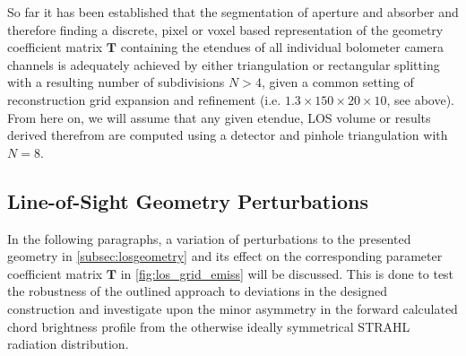             So far it has been established that the segmentation of aperture and absorber and therefore finding a discrete, pixel or voxel based representation of the geometry coefficient matrix $\mathbf{T}$ containing the etendues of all individual bolometer camera channels is adequately achieved by either triangulation or rectangular splitting with a resulting number of subdivisions $N>4$, given a common setting of reconstruction grid expansion and refinement (i.e. $1.3\times150\times20\times10$, see above). From here on, we will assume that any given etendue, LOS volume or results derived therefrom are computed using a detector and pinhole triangulation with $N=8$.\\%
%
        \subsection{Line-of-Sight Geometry Perturbations}\label{subsec:geompertub}%
%
        In the following paragraphs, a variation of perturbations to the presented geometry in \cref{subsec:losgeometry} and its effect on the corresponding parameter coefficient matrix $\mathbf{T}$ in \cref{fig:los_grid_emiss} will be discussed. This is done to test the robustness of the outlined approach to deviations in the designed construction and investigate upon the minor asymmetry in the forward calculated chord brightness profile from the otherwise ideally symmetrical STRAHL radiation distribution.%
%
